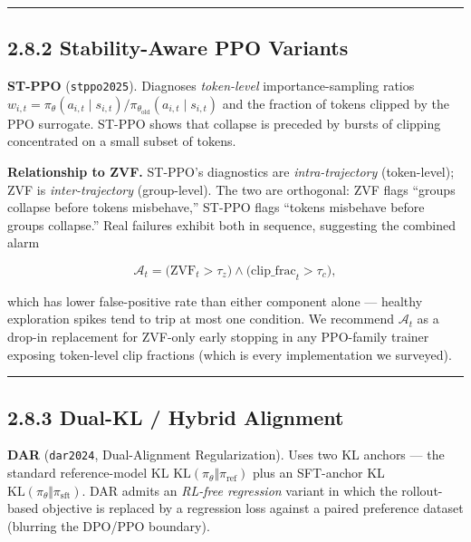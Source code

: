 \documentclass[
  american,
  11pt,
  a4paper,
  oneside]{report}
\begin{document}
\begin{center}\rule{0.5\linewidth}{0.5pt}\end{center}

\subsection{2.8.2 Stability-Aware PPO
Variants}\label{stability-aware-ppo-variants}

\textbf{ST-PPO} (\texttt{stppo2025}). Diagnoses \emph{token-level}
importance-sampling ratios
\(w_{i,t} = \pi_\theta(a_{i,t} \mid s_{i,t}) / \pi_{\theta_{\text{old}}}(a_{i,t} \mid s_{i,t})\)
and the fraction of tokens clipped by the PPO surrogate. ST-PPO shows
that collapse is preceded by bursts of clipping concentrated on a small
subset of tokens.

\textbf{Relationship to ZVF.} ST-PPO's diagnostics are
\emph{intra-trajectory} (token-level); ZVF is \emph{inter-trajectory}
(group-level). The two are orthogonal: ZVF flags ``groups collapse
before tokens misbehave,'' ST-PPO flags ``tokens misbehave before groups
collapse.'' Real failures exhibit both in sequence, suggesting the
combined alarm

\[\mathcal{A}_t = \bigl(\mathrm{ZVF}_t > \tau_z\bigr) \wedge \bigl(\mathrm{clip\_frac}_t > \tau_c\bigr),\]

which has lower false-positive rate than either component alone ---
healthy exploration spikes tend to trip at most one condition. We
recommend \(\mathcal{A}_t\) as a drop-in replacement for ZVF-only early
stopping in any PPO-family trainer exposing token-level clip fractions
(which is every implementation we surveyed).

\begin{center}\rule{0.5\linewidth}{0.5pt}\end{center}

\subsection{2.8.3 Dual-KL / Hybrid
Alignment}\label{dual-kl-hybrid-alignment}

\textbf{DAR} (\texttt{dar2024}, Dual-Alignment Regularization). Uses two
KL anchors --- the standard reference-model KL
\(\mathrm{KL}(\pi_\theta \Vert \pi_{\text{ref}})\) plus an SFT-anchor KL
\(\mathrm{KL}(\pi_\theta \Vert \pi_{\text{sft}})\). DAR admits an
\emph{RL-free regression} variant in which the rollout-based objective
is replaced by a regression loss against a paired preference dataset
(blurring the DPO/PPO boundary).
\end{document}
